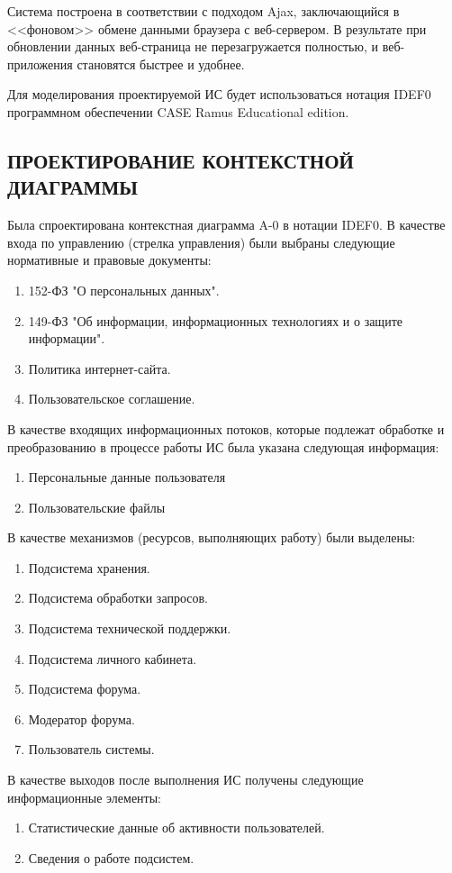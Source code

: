 \documentclass[a4paper,14pt]{extarticle}
\begin{document}
Система построена в соответствии с подходом Ajax, заключающийся в <<фоновом>> обмене данными браузера с веб-сервером. В результате при обновлении данных веб-страница не перезагружается полностью, и веб-приложения становятся быстрее и удобнее.

Для моделирования проектируемой ИС будет
использоваться нотация IDEF0 программном обеспечении CASE Ramus
Educational edition.

\subsection{ПРОЕКТИРОВАНИЕ КОНТЕКСТНОЙ ДИАГРАММЫ}

Была спроектирована контекстная диаграмма A-0 в нотации IDEF0.
В качестве входа по управлению (стрелка управления) были выбраны
следующие нормативные и правовые документы:

\begin{enumerate}
	\item 152-ФЗ "О персональных данных".
	\item 149-ФЗ "Об информации, информационных технологиях и о защите информации".
	\item Политика интернет-сайта.
	\item Пользовательское соглашение.
\end{enumerate}

В качестве входящих информационных потоков, которые подлежат
обработке и преобразованию в процессе работы ИС была указана следующая
информация:
\begin{enumerate}
	\item Персональные данные пользователя
	\item Пользовательские файлы
\end{enumerate}

В качестве механизмов (ресурсов, выполняющих работу) были
выделены:
\begin{enumerate}
	\item Подсистема хранения.
	\item Подсистема обработки запросов.
	\item Подсистема технической поддержки.
	\item Подсистема личного кабинета.
	\item Подсистема форума.
	\item Модератор форума.
	\item Пользователь системы.
\end{enumerate}

В качестве выходов после выполнения ИС получены следующие
информационные элементы:
\begin{enumerate}
	\item Статистические данные об активности пользователей.
	\item Сведения о работе подсистем.
\end{enumerate}
\end{document}
